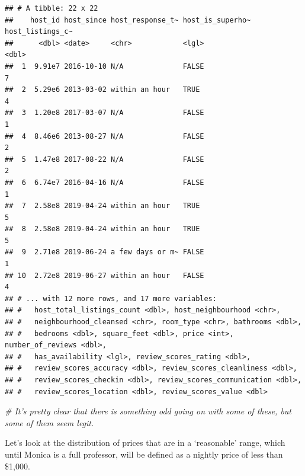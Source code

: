 \documentclass[
]{book}
\newenvironment{Shaded}{\begin{snugshade}}{\end{snugshade}}
\newcommand{\CommentTok}[1]{\textcolor[rgb]{0.56,0.35,0.01}{\textit{#1}}}
\newcommand{\DecValTok}[1]{\textcolor[rgb]{0.00,0.00,0.81}{#1}}
\newcommand{\KeywordTok}[1]{\textcolor[rgb]{0.13,0.29,0.53}{\textbf{#1}}}
\newcommand{\NormalTok}[1]{#1}
\newcommand{\OperatorTok}[1]{\textcolor[rgb]{0.81,0.36,0.00}{\textbf{#1}}}
\newcommand{\StringTok}[1]{\textcolor[rgb]{0.31,0.60,0.02}{#1}}
\begin{document}
\begin{Shaded}
\end{Shaded}

\begin{verbatim}
## # A tibble: 22 x 22
##    host_id host_since host_response_t~ host_is_superho~ host_listings_c~
##      <dbl> <date>     <chr>            <lgl>                       <dbl>
##  1  9.91e7 2016-10-10 N/A              FALSE                           7
##  2  5.29e6 2013-03-02 within an hour   TRUE                            4
##  3  1.20e8 2017-03-07 N/A              FALSE                           1
##  4  8.46e6 2013-08-27 N/A              FALSE                           2
##  5  1.47e8 2017-08-22 N/A              FALSE                           2
##  6  6.74e7 2016-04-16 N/A              FALSE                           1
##  7  2.58e8 2019-04-24 within an hour   TRUE                            5
##  8  2.58e8 2019-04-24 within an hour   TRUE                            5
##  9  2.71e8 2019-06-24 a few days or m~ FALSE                           1
## 10  2.72e8 2019-06-27 within an hour   FALSE                           4
## # ... with 12 more rows, and 17 more variables:
## #   host_total_listings_count <dbl>, host_neighbourhood <chr>,
## #   neighbourhood_cleansed <chr>, room_type <chr>, bathrooms <dbl>,
## #   bedrooms <dbl>, square_feet <dbl>, price <int>, number_of_reviews <dbl>,
## #   has_availability <lgl>, review_scores_rating <dbl>,
## #   review_scores_accuracy <dbl>, review_scores_cleanliness <dbl>,
## #   review_scores_checkin <dbl>, review_scores_communication <dbl>,
## #   review_scores_location <dbl>, review_scores_value <dbl>
\end{verbatim}

\begin{Shaded}
\begin{Highlighting}[]
\CommentTok{# It's pretty clear that there is something odd going on with some of these, but some of them seem legit.}
\end{Highlighting}
\end{Shaded}

Let's look at the distribution of prices that are in a `reasonable' range, which until Monica is a full professor, will be defined as a nightly price of less than \$1,000.
\end{document}

